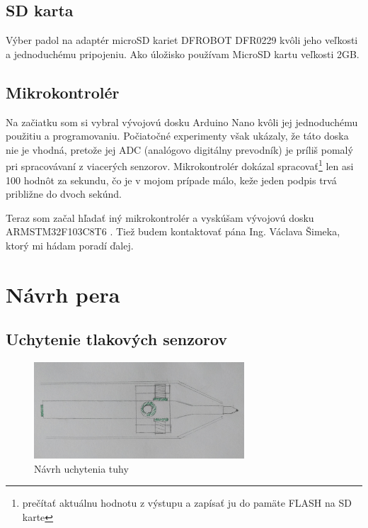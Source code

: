 \subsection*{SD karta}

Výber padol na adaptér microSD kariet DFROBOT DFR0229 kvôli jeho veľkosti a jednoduchému pripojeniu. Ako úložisko používam MicroSD kartu veľkosti 2GB. 

\subsection*{Mikrokontrolér}

Na začiatku som si vybral vývojovú dosku Arduino Nano kvôli jej jednoduchému použitiu a programovaniu. 
Počiatočné experimenty však ukázaly, že táto doska nie je vhodná, pretože jej ADC (analógovo digitálny prevodník) je príliš pomalý pri spracovávaní z viacerých senzorov. Mikrokontrolér dokázal spracovať\footnote{prečítať aktuálnu hodnotu z výstupu a zapísať ju do pamäte FLASH na SD karte} len asi 100 hodnôt za sekundu, čo je v mojom prípade málo, keže jeden podpis trvá približne do dvoch sekúnd.

Teraz som začal hľadať iný mikrokontrolér a vyskúšam vývojovú dosku ARMSTM32F103C8T6 \cite{ArduinoARM}. Tiež budem kontaktovať pána Ing. Václava Šimeka, ktorý mi hádam poradí ďalej.


\section{Návrh pera}

\subsection*{Uchytenie tlakových senzorov}

\begin{figure}[hbt]
	\centering
	\includegraphics[width=0.7\textwidth]{obrazky-figures/umiestnenie_tlakovych_senzorov.png}
	\caption{Návrh uchytenia tuhy}
	\label{piezoPen1997}
\end{figure}

